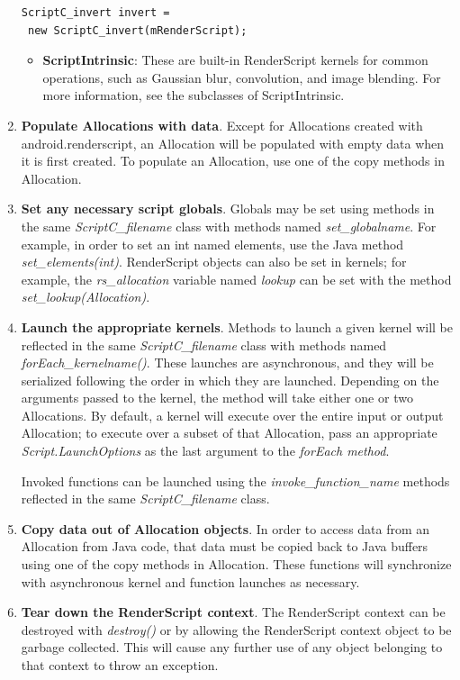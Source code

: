 \documentclass[a4paper,10pt]{article}
\begin{document}
\begin{multicols}{2}
\begin{enumerate}
\begin{itemize}
\end{itemize}
\begin{lstlisting}[frame=single]
ScriptC_invert invert =
 new ScriptC_invert(mRenderScript);
\end{lstlisting}
\begin{itemize}
\item {\bf ScriptIntrinsic}: These are built-in RenderScript kernels for common operations, such as Gaussian blur, convolution, and image blending. For more information, see the subclasses of ScriptIntrinsic.
\end{itemize}
\item {\bf Populate Allocations with data}. Except for Allocations created with android.renderscript, an Allocation will be populated with empty data when it is first created. To populate an Allocation, use one of the copy methods in Allocation.
\item {\bf Set any necessary script globals}. Globals may be set using methods in the same \emph{ScriptC\_filename} class with methods named \emph{set\_globalname}. For example, in order to set an int named elements, use the Java method \emph{set\_elements(int)}. RenderScript objects can also be set in kernels; for example, the \emph{rs\_allocation} variable named \emph{lookup} can be set with the method \emph{set\_lookup(Allocation)}.
\item {\bf Launch the appropriate kernels}. Methods to launch a given kernel will be reflected in the same \emph{ScriptC\_filename} class with methods named \emph{forEach\_kernelname()}. These launches are asynchronous, and they will be serialized following the order in which they are launched. Depending on the arguments passed to the kernel, the method will take either one or two Allocations. By default, a kernel will execute over the entire input or output Allocation; to execute over a subset of that Allocation, pass an appropriate \emph{Script.LaunchOptions} as the last argument to the \emph{forEach method}.

Invoked functions can be launched using the \emph{invoke\_function\_name} methods reflected in the same \emph{ScriptC\_filename} class.
\item {\bf Copy data out of Allocation objects}. In order to access data from an Allocation from Java code, that data must be copied back to Java buffers using one of the copy methods in Allocation. These functions will synchronize with asynchronous kernel and function launches as necessary.
\item {\bf Tear down the RenderScript context}. The RenderScript context can be destroyed with \emph{destroy()} or by allowing the RenderScript context object to be garbage collected. This will cause any further use of any object belonging to that context to throw an exception.
\end{enumerate} 


\end{multicols}
\end{document}
